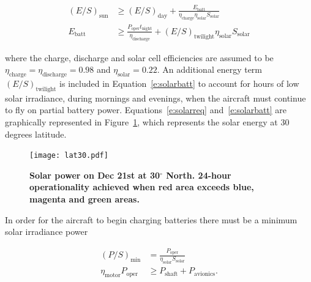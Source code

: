\begin{align}
    \label{e:solarreq}
    (E/S)_{\text{sun}}  &\geq (E/S)_{\text{day}} + \frac{E_{\text{batt}}}{\eta_{\text{charge}}\eta_{\text{solar}} S_{\text{solar}}} \\
    \label{e:solarbatt}
    E_{\text{batt}} &\geq \frac{P_{\text{oper}}t_{\text{night}}}{\eta_{\text{discharge}}} + (E/S)_{\text{twilight}} \eta_{\text{solar}} S_{\text{solar}}
\end{align}

where the charge, discharge and solar cell efficiencies are assumed to be $\eta_{\text{charge}} = \eta_{\text{discharge}} = 0.98$ and $\eta_{\text{solar}}= 0.22$. 
An additional energy term $(E/S)_{\text{twilight}}$ is included in Equation~\eqref{e:solarbatt} to account for hours of low solar irradiance, during mornings and evenings, when the aircraft must continue to fly on partial battery power. 
Equations~\eqref{e:solarreq} and~\eqref{e:solarbatt} are graphically represented in Figure~\ref{f:lat30}, which represents the solar energy at 30 degrees latitude. 

\begin{figure}[H]
	\begin{center}
	\texttt{[image: lat30.pdf]}
    \caption{\textbf{Solar power on Dec 21st at 30$^{\circ}$ North. 24-hour operationality achieved when red area exceeds blue, magenta and green areas. }}
	\label{f:lat30}
	\end{center}
\end{figure}

In order for the aircraft to begin charging batteries there must be a minimum solar irradiance power

\begin{align}
    (P/S)_{\text{min}} &= \frac{P_{\text{oper}}}{\eta_{\text{solar}} S_{\text{solar}}} \\
    \eta_{\text{motor}} P_{\text{oper}} &\geq P_{\text{shaft}} + P_{\text{avionics}}.
\end{align}

